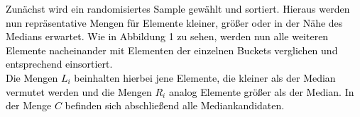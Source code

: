 \documentclass[a1,portrait]{a0poster}
\begin{document}
\noindent
\textcolor{black}{
Zunächst wird ein randomisiertes Sample gewählt und sortiert. 
Hieraus werden nun repräsentative Mengen für Elemente kleiner, größer 
oder in der Nähe des Medians erwartet. 
Wie in Abbildung 1 zu sehen, werden nun alle weiteren Elemente nacheinander 
mit Elementen der einzelnen Buckets verglichen und entsprechend einsortiert.\\
Die Mengen $L_i$ beinhalten hierbei jene Elemente, die kleiner als der Median vermutet 
werden und die Mengen $R_i$ analog Elemente größer als der Median. 
In der Menge $C$ befinden sich abschließend alle Mediankandidaten.
}\\
\color{goetheblau}{\rule{\textwidth}{0.1cm}}
\end{document}
